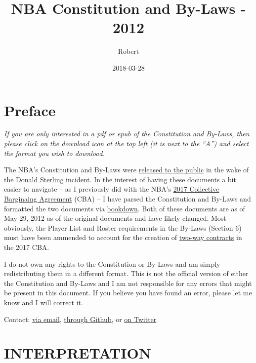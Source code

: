 \documentclass[]{book}
\title{NBA Constitution and By-Laws - 2012}
\author{Robert}
\date{2018-03-28}
\theoremstyle{definition}
\theoremstyle{definition}
\theoremstyle{definition}
\theoremstyle{remark}
\begin{document}
\maketitle

{
\setcounter{tocdepth}{1}
\tableofcontents
}
\chapter*{Preface}\label{preface}

\emph{If you are only interested in a pdf or epub of the Constitution
and By-Laws, then please click on the download icon at the top left (it
is next to the ``A'') and select the format you wish to download.}

The NBA's Constitution and By-Laws were
\href{http://prawfsblawg.blogs.com/files/221035054-nba-constitution-and-by-laws.pdf}{released
to the public} in the wake of the
\href{https://deadspin.com/that-secret-nba-constitution-is-now-online-1569509012}{Donald
Sterling incident}. In the interest of having these documents a bit
easier to navigate -- as I previously did with the NBA's
\href{https://atlhawksfanatic.github.io/NBA-CBA/}{2017 Collective
Barginaing Agreement} (CBA) -- I have parsed the Constitution and
By-Laws and formatted the two documents via
\href{https://bookdown.org/yihui/bookdown/}{bookdown}. Both of these
documents are as of May 29, 2012 as of the original documents and have
likely changed. Most obviously, the Player List and Roster requirements
in the By-Laws (Section 6) must have been ammended to account for the
creation of
\href{https://atlhawksfanatic.github.io/NBA-CBA/uniform-player-contract.html\#two-way-contracts.}{two-way
contracts} in the 2017 CBA.

I do not own any rights to the Constitution or By-Laws and am simply
redistributing them in a different format. This is not the official
version of either the Constitution and By-Laws and I am not responsible
for any errors that might be present in this document. If you believe
you have found an error, please let me know and I will correct it.

Contact: \href{atlhawksfanatic@gmail.com}{via email},
\href{https://github.com/atlhawksfanatic}{through Github}, or
\href{https://twitter.com/atlhawksfanatic}{on Twitter}

\chapter{INTERPRETATION}\label{interpretation}
\end{document}
